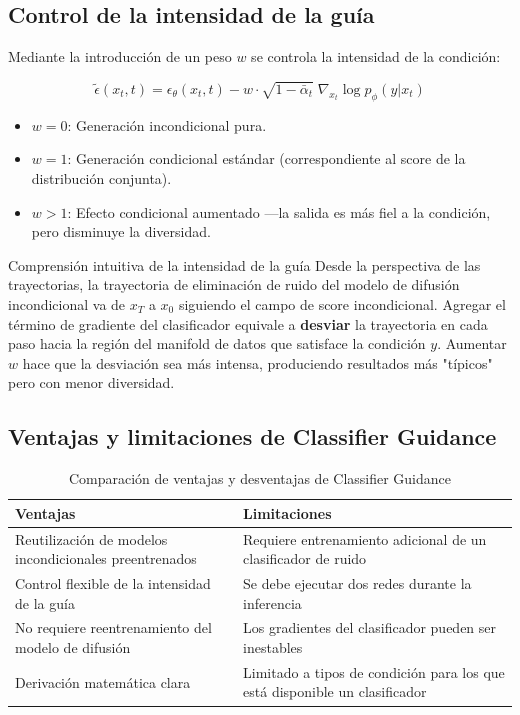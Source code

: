 \documentclass[a4paper]{article}
\begin{document}
\subsection{Control de la intensidad de la guía}

Mediante la introducción de un peso $w$ se controla la intensidad de la condición:

$$
\tilde{\epsilon}(x_t, t) = \epsilon_\theta(x_t, t) - w\cdot\sqrt{1-\bar\alpha_t}\;\nabla_{x_t}\log p_\phi(y|x_t)
$$

\begin{itemize}
    \item $w = 0$: Generación incondicional pura.
    \item $w = 1$: Generación condicional estándar (correspondiente al score de la distribución conjunta).
    \item $w > 1$: Efecto condicional aumentado —la salida es más fiel a la condición, pero disminuye la diversidad.
\end{itemize}

\begin{knowledgebox}{Comprensión intuitiva de la intensidad de la guía}
Desde la perspectiva de las trayectorias, la trayectoria de eliminación de ruido del modelo de difusión incondicional va de $x_T$ a $x_0$ siguiendo el campo de score incondicional. Agregar el término de gradiente del clasificador equivale a \textbf{desviar} la trayectoria en cada paso hacia la región del manifold de datos que satisface la condición $y$. Aumentar $w$ hace que la desviación sea más intensa, produciendo resultados más "típicos" pero con menor diversidad.
\end{knowledgebox}

\subsection{Ventajas y limitaciones de Classifier Guidance}

\begin{table}[H]
\centering
\begin{tabular}{p{6cm}p{6cm}}
\toprule
\textbf{Ventajas} & \textbf{Limitaciones} \\
\midrule
Reutilización de modelos incondicionales preentrenados & Requiere entrenamiento adicional de un clasificador de ruido \\
Control flexible de la intensidad de la guía & Se debe ejecutar dos redes durante la inferencia \\
No requiere reentrenamiento del modelo de difusión & Los gradientes del clasificador pueden ser inestables \\
Derivación matemática clara & Limitado a tipos de condición para los que está disponible un clasificador \\
\bottomrule
\end{tabular}
\caption{Comparación de ventajas y desventajas de Classifier Guidance}
\end{table}
\end{document}

